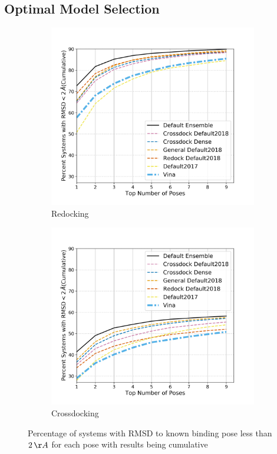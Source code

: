 \documentclass[journal=jcisd8,manuscript=article]{achemso}
\begin{document}
\subsection{Optimal Model Selection}
\begin{figure}
	\begin{subfigure}[b]{0.48\textwidth}
		\centering
		\includegraphics[width=\textwidth]{figures/redocking/rescore_single_models_line.png}
		\caption{Redocking}
		\label{fig:resc single rd}
        \end{subfigure}    
	\begin{subfigure}[b]{0.48\textwidth}    
		\centering
		\includegraphics[width=\textwidth]{figures/crossdocking/rescore_single_models_line.png}
		\caption{Crossdocking}
		\label{fig:resc single cd}
        \end{subfigure}    
	\caption{Percentage of systems with RMSD to known binding pose less than $2\,\AA$ for each pose with results being cumulative}
	\label{fig:rescsingle}
\end{figure}    
\end{document}
